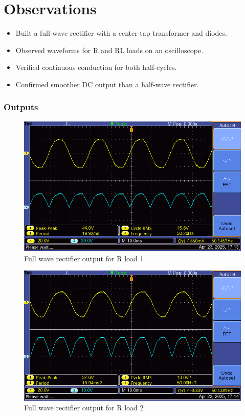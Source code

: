\documentclass[12pt]{article}
\begin{document}
\section*{Observations}
\begin{itemize}
    \item Built a full-wave rectifier with a center-tap transformer and diodes.
    \item Observed waveforms for R and RL loads on an oscilloscope.
    \item Verified continuous conduction for both half-cycles.
    \item Confirmed smoother DC output than a half-wave rectifier.
\end{itemize}

\subsubsection*{Outputs}
\begin{figure}[H]
    \centering
    \includegraphics[width=.7\textwidth]{full_r_load3.png}
    \caption{Full wave rectifier output for R load 1}
    \label{fig:rLoad}
\end{figure}

\begin{figure}[H]
    \centering
    \includegraphics[width=.7\textwidth]{full_r_load5.png}
    \caption{Full wave rectifier output for R load 2}
    \label{fig:rLoadDelay}
\end{figure}


\renewcommand{\bibname}{References}

\end{document}
